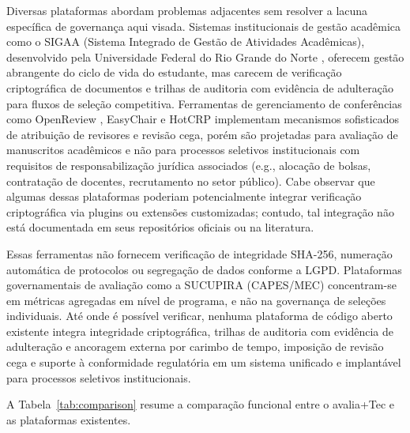 \documentclass[preprint,12pt,a4paper]{elsarticle}
\begin{document}
Diversas plataformas abordam problemas adjacentes sem resolver a lacuna específica de governança aqui visada. Sistemas institucionais de gestão acadêmica como o SIGAA (Sistema Integrado de Gestão de Atividades Acadêmicas), desenvolvido pela Universidade Federal do Rio Grande do Norte \citep{SIGAA2023}, oferecem gestão abrangente do ciclo de vida do estudante, mas carecem de verificação criptográfica de documentos e trilhas de auditoria com evidência de adulteração para fluxos de seleção competitiva. Ferramentas de gerenciamento de conferências como OpenReview \citep{Soergel2013}, EasyChair \citep{EasyChair2024} e HotCRP \citep{Kohler2004} implementam mecanismos sofisticados de atribuição de revisores e revisão cega, porém são projetadas para avaliação de manuscritos acadêmicos e não para processos seletivos institucionais com requisitos de responsabilização jurídica associados (e.g., alocação de bolsas, contratação de docentes, recrutamento no setor público). Cabe observar que algumas dessas plataformas poderiam potencialmente integrar verificação criptográfica via plugins ou extensões customizadas; contudo, tal integração não está documentada em seus repositórios oficiais ou na literatura. 

Essas ferramentas não fornecem verificação de integridade SHA-256, numeração automática de protocolos ou segregação de dados conforme a LGPD. Plataformas governamentais de avaliação como a SUCUPIRA (CAPES/MEC) \citep{CAPES2024} concentram-se em métricas agregadas em nível de programa, e não na governança de seleções individuais. Até onde é possível verificar, nenhuma plataforma de código aberto existente integra integridade criptográfica, trilhas de auditoria com evidência de adulteração e ancoragem externa por carimbo de tempo, imposição de revisão cega e suporte à conformidade regulatória em um sistema unificado e implantável para processos seletivos institucionais.

A Tabela~\ref{tab:comparison} resume a comparação funcional entre o avalia+Tec e as plataformas existentes.
\end{document}
